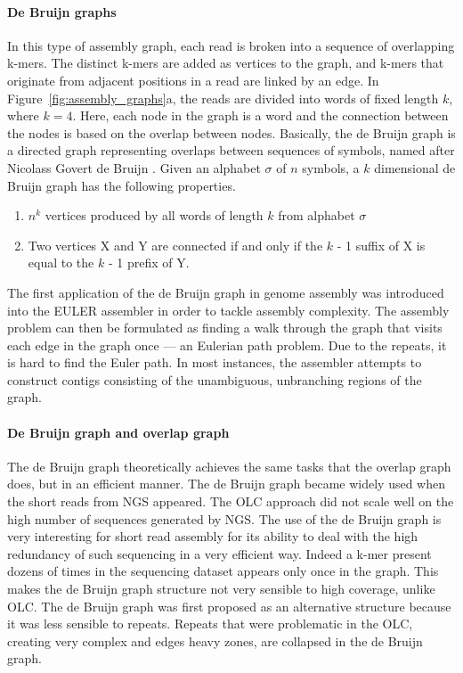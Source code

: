 \paragraph{De Bruijn graphs}
In this type of assembly graph, each read is broken into a sequence of overlapping k-mers. The distinct
k-mers are added as vertices to the graph, and k-mers that originate from adjacent positions in
a read are linked by an edge.
In Figure~\ref{fig:assembly_graphs}a, the reads are divided into words of fixed length $k$, where $k=4$. Here,
each node in the graph is a word and the connection between the nodes is based on the overlap between nodes.
Basically, the de Bruijn graph is a directed graph representing overlaps
between sequences of symbols, named after Nicolass Govert de Bruijn \citep{todd1933combinatorial}. Given an
alphabet $\sigma$ of $n$ symbols, a $k$ dimensional de Bruijn graph has the following properties.
\begin{enumerate}
 \item $n^k$ vertices produced by all words of length $k$ from alphabet $\sigma$
 \item Two vertices X and Y are connected if and only if the $k$ - 1
suffix of X is equal to the $k$ - 1 prefix of Y.
\end{enumerate}

The first application of the de Bruijn graph in genome assembly was introduced into
the EULER assembler \citep{pevzner2001eulerian} in order to tackle assembly complexity. 
The assembly problem can then be formulated as finding a walk
through the graph that visits each edge in the graph once --- an Eulerian path problem.
Due to the repeats, it is hard to find the Euler path. 
In most instances, the assembler attempts to construct
contigs consisting of the unambiguous, unbranching regions of the graph.

\paragraph{De Bruijn graph and overlap graph}
The de Bruijn graph theoretically achieves
the same tasks that the overlap graph does, but in an efficient manner.
The de Bruijn graph became widely used when the short reads from NGS appeared. The OLC
approach did not scale well on the high number of sequences generated by NGS. The
use of the de Bruijn graph is very interesting for short read assembly for its ability to
deal with the high redundancy of such sequencing in a very efficient way. Indeed a k-mer
present dozens of times in the sequencing dataset appears only once in the graph. This
makes the de Bruijn graph structure not very sensible to high coverage, unlike
OLC. The de Bruijn graph was first proposed as an alternative structure \citep{pevzner2001eulerian} because it
was less sensible to repeats. Repeats that were problematic in the OLC, creating very
complex and edges heavy zones, are collapsed in the de Bruijn graph.

